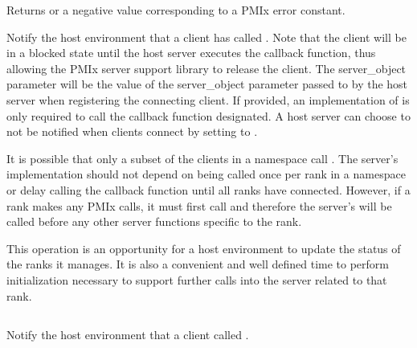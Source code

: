 \begin{arglist}
\end{arglist}

Returns  or a negative value corresponding to a PMIx error constant.

\descr

Notify the host environment that a client has called .
Note that the client will be in a blocked state until the host server executes the callback function, thus allowing the \ac{PMIx} server support library to release
the client.
The server_object parameter will be the value of the server_object parameter passed to
 by the host server when registering the connecting client.  If provided, an implementation of 
is only required to
call the callback function designated.  A host server can choose to not be notified when clients connect by setting  to .

It is possible that only a subset of the clients in a namespace call .   The server's  implementation
should not depend on being called once per rank in a namespace or delay calling the callback function until all ranks have connected.
However, if a rank makes any \ac{PMIx} calls, it must first call  and
therefore the server's  will be called before any other server functions specific to the rank.

\advicermstart
 This operation is an opportunity for a host environment
 to update the status of the ranks it manages.  It is also a convenient and well defined time to perform initialization necessary to
 support further calls into the server related to that rank.
 \advicermend

\subsection{}

\summary

Notify the host environment that a client called .

